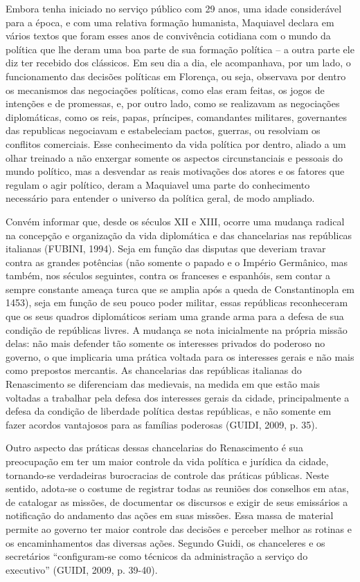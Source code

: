 Embora tenha iniciado no serviço público com 29 anos, uma idade
considerável para a época, e com uma relativa formação humanista,
Maquiavel declara em vários textos que foram esses anos de convivência
cotidiana com o mundo da política que lhe deram uma boa parte de sua
formação política -- a outra parte ele diz ter recebido dos clássicos.
Em seu dia a dia, ele acompanhava, por um lado, o funcionamento das
decisões políticas em Florença, ou seja, observava por dentro os
mecanismos das negociações políticas, como elas eram feitas, os jogos de
intenções e de promessas, e, por outro lado, como se realizavam as
negociações diplomáticas, como os reis, papas, príncipes, comandantes
militares, governantes das republicas negociavam e estabeleciam pactos,
guerras, ou resolviam os conflitos comerciais. Esse conhecimento da vida
política por dentro, aliado a um olhar treinado a não enxergar somente
os aspectos circunstanciais e pessoais do mundo político, mas a
desvendar as reais motivações dos atores e os fatores que regulam o agir
político, deram a Maquiavel uma parte do conhecimento necessário para
entender o universo da política geral, de modo ampliado.

Convém informar que, desde os séculos XII e XIII, ocorre uma mudança
radical na concepção e organização da vida diplomática e das
chancelarias nas repúblicas italianas (FUBINI, 1994). Seja em função das
disputas que deveriam travar contra as grandes potências (não somente o
papado e o Império Germânico, mas também, nos séculos seguintes, contra
os franceses e espanhóis, sem contar a sempre constante ameaça turca que
se amplia após a queda de Constantinopla em 1453), seja em função de seu
pouco poder militar, essas repúblicas reconheceram que os seus quadros
diplomáticos seriam uma grande arma para a defesa de sua condição de
repúblicas livres. A mudança se nota inicialmente na própria missão
delas: não mais defender tão somente os interesses privados do poderoso
no governo, o que implicaria uma prática voltada para os interesses
gerais e não mais como prepostos mercantis. As chancelarias das
repúblicas italianas do Renascimento se diferenciam das medievais, na
medida em que estão mais voltadas a trabalhar pela defesa dos interesses
gerais da cidade, principalmente a defesa da condição de liberdade
política destas repúblicas, e não somente em fazer acordos vantajosos
para as famílias poderosas (GUIDI, 2009, p. 35).

Outro aspecto das práticas dessas chancelarias do Renascimento é sua
preocupação em ter um maior controle da vida política e jurídica da
cidade, tornando-se verdadeiras burocracias de controle das práticas
públicas. Neste sentido, adota-se o costume de registrar todas as
reuniões dos conselhos em atas, de catalogar as missões, de documentar
os discursos e exigir de seus emissários a notificação do andamento das
ações em suas missões. Essa massa de material permite ao governo ter
maior controle das decisões e perceber melhor as rotinas e os
encaminhamentos das diversas ações. Segundo Guidi, os chanceleres e os
secretários ``configuram-se como técnicos da administração a serviço do
executivo'' (GUIDI, 2009, p. 39-40).

